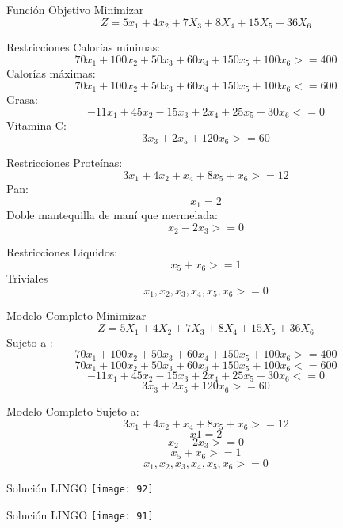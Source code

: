 \documentclass{beamer}
\begin{document}
\begin{frame}[fragile]{Funci\'on Objetivo}
Minimizar\\
\[Z = 5x_{1} + 4x_{2} +7X_{3} + 8X_{4} + 15X_{5} +36X_{6}\]
\end{frame}

\begin{frame}[fragile]{Restricciones}
Calor\'ias m\'inimas:\\
\[70x_{1} + 100x_{2} + 50x_{3} + 60x_{4} + 150x_{5} + 100x_{6} >= 400\]
Calor\'ias m\'aximas:
\[70x_{1} + 100x_{2} + 50x_{3} + 60x_{4} + 150x_{5} + 100x_{6} <= 600\]
Grasa:\\
\[-11x_{1} + 45x_{2} - 15x_{3} + 2x_{4} + 25x_{5} - 30x_{6}  <=  0\]
Vitamina C:\\
\[3x_{3} + 2x_{5} + 120x_{6} >= 60\]
\end{frame}
\begin{frame}[fragile]{Restricciones}
Prote\'inas:\\
\[3x_{1} + 4x_{2} + x_{4} + 8x_{5} + x_{6} >= 12\]
Pan:
\[x_{1} = 2\]
Doble mantequilla de man\'i que mermelada:\\
\[x_{2} - 2x_{3} >= 0\]
\end{frame}
\begin{frame}[fragile]{Restricciones}
L\'iquidos:\\
\[x_{5} + x_{6} >= 1 \]
Triviales\\
 \[x_{1}, x_{2}, x_{3}, x_{4}, x_{5}, x_{6} >= 0\]
\end{frame}

\begin{frame}[fragile]{Modelo Completo}
Minimizar\\
\[Z = 5X_{1} + 4X_{2} +7X_{3} + 8X_{4} + 15X_{5} +36X_{6}\]
Sujeto a :\\
\[70x_{1} + 100x_{2} + 50x_{3} + 60x_{4} + 150x_{5} + 100x_{6} >= 400\]
\[70x_{1} + 100x_{2} + 50x_{3} + 60x_{4} + 150x_{5} + 100x_{6} <= 600\]
\[-11x_{1} + 45x_{2} - 15x_{3} + 2x_{4} + 25x_{5} - 30x_{6}  <=  0\]
\[3x_{3} + 2x_{5} + 120x_{6} >= 60\]
\end{frame}

\begin{frame}[fragile]{Modelo Completo}
Sujeto a:\\
\[3x_{1} + 4x_{2} + x_{4} + 8x_{5} + x_{6} >= 12\]
\[x{1} = 2\]
\[x_{2} - 2x_{3} >= 0\]
\[x_{5} + x_{6} >= 1 \]
\[x_{1}, x_{2}, x_{3}, x_{4}, x_{5}, x_{6} >= 0\]

\end{frame}

\begin{frame}[fragile]{Soluci\'on LINGO}
    \texttt{[image: 92]}
\end{frame}
\begin{frame}[fragile]{Soluci\'on LINGO}
    \texttt{[image: 91]}
\end{frame}
\end{document}
